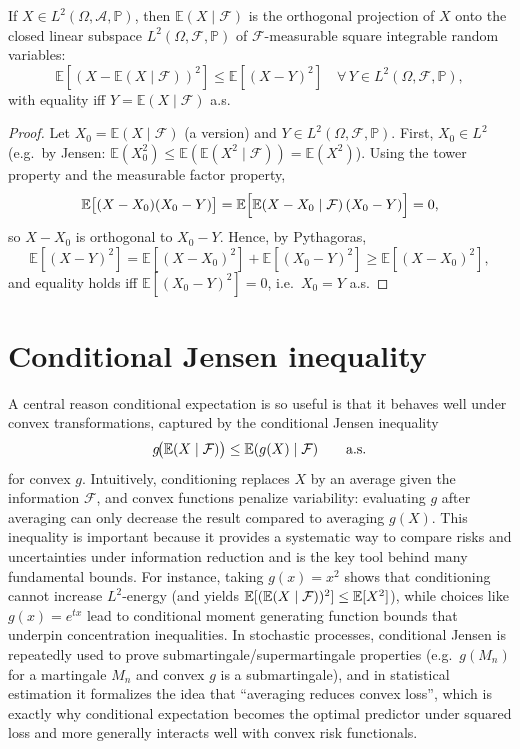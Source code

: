 \begin{theorem}
\label{thm:best_approx}
If $X\in L^2(\Omega,\mathcal A,\mathbb P)$, then $\mathbb E(X\mid\mathcal F)$ is the orthogonal projection of $X$
onto the closed linear subspace $L^2(\Omega,\mathcal F,\mathbb P)$ of $\mathcal F$-measurable square integrable random variables:
\[
\mathbb E\!\left[(X-\mathbb E(X\mid\mathcal F))^2\right]\le \mathbb E[(X-Y)^2]
\quad \forall\,Y\in L^2(\Omega,\mathcal F,\mathbb P),
\]
with equality iff $Y=\mathbb E(X\mid\mathcal F)$ a.s.
\end{theorem}

\begin{proof}
Let $X_0=\mathbb E(X\mid\mathcal F)$ (a version) and $Y\in L^2(\Omega,\mathcal F,\mathbb P)$.
First, $X_0\in L^2$ (e.g.\ by Jensen: $\mathbb E(X_0^2)\le \mathbb E(\mathbb E(X^2\mid\mathcal F))=\mathbb E(X^2)$).
Using the tower property and the measurable factor property,
\[
\mathbb E\bigl[(X-X_0)(X_0-Y)\bigr]
=\mathbb E\Bigl[\mathbb E(X-X_0\mid\mathcal F)\,(X_0-Y)\Bigr]=0,
\]
so $X-X_0$ is orthogonal to $X_0-Y$. Hence, by Pythagoras,
\[
\mathbb E[(X-Y)^2]=\mathbb E[(X-X_0)^2]+\mathbb E[(X_0-Y)^2]\ge \mathbb E[(X-X_0)^2],
\]
and equality holds iff $\mathbb E[(X_0-Y)^2]=0$, i.e.\ $X_0=Y$ a.s.
\end{proof}

\section{Conditional Jensen inequality}
A central reason conditional expectation is so useful is that it behaves well under convex transformations, captured by the
conditional Jensen inequality
\[
g\!\bigl(\mathbb{E}(X\mid\mathcal F)\bigr)\le \mathbb{E}(g(X)\mid\mathcal F)\qquad\text{a.s.}
\]
for convex $g$. Intuitively, conditioning replaces $X$ by an average given the information $\mathcal F$, and convex functions
penalize variability: evaluating $g$ after averaging can only decrease the result compared to averaging $g(X)$. This inequality
is important because it provides a systematic way to compare risks and uncertainties under information reduction and is the
key tool behind many fundamental bounds. For instance, taking $g(x)=x^2$ shows that conditioning cannot increase $L^2$-energy
(and yields $\mathbb{E}[(\mathbb{E}(X\mid\mathcal F))^2]\le \mathbb{E}[X^2]$), while choices like $g(x)=e^{tx}$ lead to conditional moment generating
function bounds that underpin concentration inequalities. In stochastic processes, conditional Jensen is repeatedly used to
prove submartingale/supermartingale properties (e.g.\ $g(M_n)$ for a martingale $M_n$ and convex $g$ is a submartingale), and
in statistical estimation it formalizes the idea that ``averaging reduces convex loss'', which is exactly why conditional
expectation becomes the optimal predictor under squared loss and more generally interacts well with convex risk functionals.


